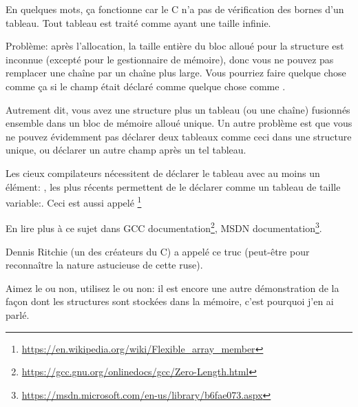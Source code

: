 En quelques mots, ça fonctionne car le C n'a pas de vérification des bornes d'un
tableau. Tout tableau est traité comme ayant une taille infinie.

Problème: après l'allocation, la taille entière du bloc alloué pour la structure
est inconnue (excepté pour le gestionnaire de mémoire), donc vous ne pouvez pas remplacer
une chaîne par un chaîne plus large.
Vous pourriez faire quelque chose comme ça si le champ était déclaré comme quelque
chose comme .

Autrement dit, vous avez une structure plus un tableau (ou une chaîne) fusionnés
ensemble dans un bloc de mémoire alloué unique.
Un autre problème est que vous ne pouvez évidemment pas déclarer deux tableaux comme
ceci dans une structure unique, ou déclarer un autre champ après un tel tableau.

Les cieux compilateurs nécessitent de déclarer le tableau avec au moins un élément:
, les plus récents permettent de le déclarer comme un tableau de taille
variable:.
Ceci est aussi appelé \footnote{\url{https://en.wikipedia.org/wiki/Flexible_array_member}}

En lire plus à ce sujet dans
GCC documentation\footnote{\url{https://gcc.gnu.org/onlinedocs/gcc/Zero-Length.html}},
MSDN documentation\footnote{\url{https://msdn.microsoft.com/en-us/library/b6fae073.aspx}}.

Dennis Ritchie (un des créateurs du C) a appelé ce truc  (peut-être pour reconnaître la nature astucieuse de cette ruse).

Aimez le ou non, utilisez le ou non:
il est encore une autre démonstration de la façon dont les structures sont stockées
dans la mémoire, c'est pourquoi j'en ai parlé.

